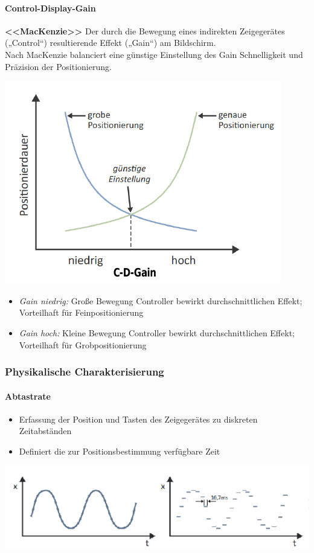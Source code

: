 \documentclass[8pt,a4paper,landscape]{extarticle}
\begin{document}
\begin{multicols*}{4}
	\paragraph{Control-Display-Gain} \textbf{<<MacKenzie>>} Der durch die
	Bewegung eines indirekten Zeigegerätes („Control“) resultierende Effekt
	(„Gain“) am Bildschirm. \\
	Nach MacKenzie balanciert eine günstige Einstellung des Gain Schnelligkeit
	und Präzision der Positionierung.
	\begin{center}
		\includegraphics[width=0.7\linewidth]{./pictures/figure_01.png}
	\end{center}
	\begin{itemize}
		\item \textit{Gain niedrig:} Große Bewegung Controller bewirkt
		      durchschnittlichen Effekt; Vorteilhaft für Feinpositionierung
		\item \textit{Gain hoch:} Kleine Bewegung Controller bewirkt
		      durchschnittlichen Effekt; Vorteilhaft für Grobpositionierung
	\end{itemize}
	\subsubsection{Physikalische Charakterisierung}
	\paragraph{Abtastrate}
	\begin{itemize}
		\item Erfassung der Position und Tasten des Zeigegerätes zu diskreten
		      Zeitabständen
		\item Definiert die zur Positionsbestimmung verfügbare Zeit
	\end{itemize}
	\begin{center}
		\includegraphics[width=\linewidth]{./pictures/figure_02.png}
	\end{center}

\end{multicols*}
\end{document}

